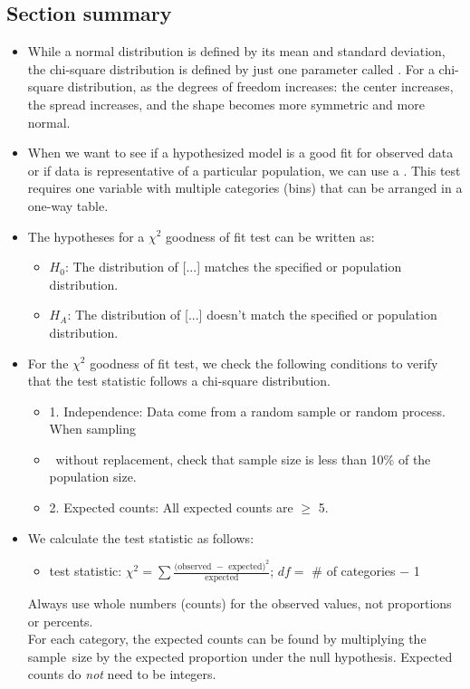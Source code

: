 \subsection*{Section summary} 
\begin{itemize}

\item While a normal distribution is defined by its mean and standard deviation, the chi-square distribution is defined by just one parameter called .  For a chi-square distribution, as the degrees of freedom increases:  the center increases, the spread increases, and the shape becomes more symmetric and more normal.

\item When we want to see if a hypothesized model is a good fit for observed data or if data is representative of a particular population, we can use a .  This test requires one variable with multiple categories (bins) that can be arranged in a one-way table.

\item The hypotheses for a $\chi^2$ goodness of fit test can be written as:
\begin{itemize}
\item[] $H_0$: The distribution of [...] matches the specified or population distribution. 
\item[] $H_A$: The distribution of [...] doesn't match the specified or population distribution. 
\end{itemize}
\item For the $\chi^2$ goodness of fit test, we check the following conditions to verify that the test statistic follows a chi-square distribution.  
\begin{itemize}
\item[] 1.  Independence:  Data come from a random sample or random process.  When sampling 
\item[] \quad \ without replacement, check that sample size is less than 10\% of the population size.
\item[] 2.  Expected counts:  All expected counts are $\ge$ 5.
\end{itemize}

\item We calculate the test statistic as follows:
\begin{itemize}
\item[] test statistic:  $\chi^2 =\sum{ \frac{\text{(observed } - \text{ expected})^2}{\text{expected}}}$; \quad \quad $df =$ \# of categories $-$ 1
\end{itemize}
Always use whole numbers (counts) for the observed values, not proportions or percents.\\
For each category, the expected counts can be found by multiplying the sample~size by the expected proportion under the null hypothesis.  Expected counts do \emph{not} need to be integers.  


\end{itemize}
